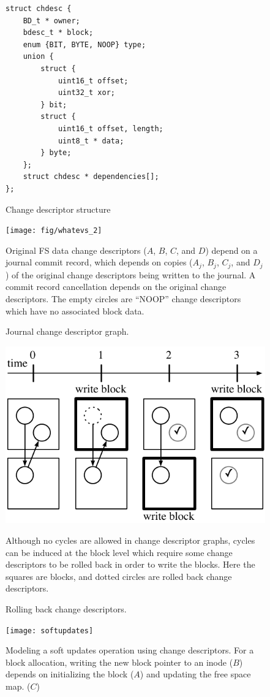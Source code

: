 \begin{figure}
\begin{verbatim}
struct chdesc {
    BD_t * owner;
    bdesc_t * block;
    enum {BIT, BYTE, NOOP} type;
    union {
        struct {
            uint16_t offset;
            uint32_t xor;
        } bit;
        struct {
            uint16_t offset, length;
            uint8_t * data;
        } byte;
    };
    struct chdesc * dependencies[];
};
\end{verbatim}
\caption{\label{fig:chdesc} Change descriptor structure}
\end{figure}

\begin{figure}
  \centering
  \texttt{[image: fig/whatevs\_2]}
  \caption{\label{fig:journal} Journal change descriptor graph.}{Original FS
  data change descriptors ($A$, $B$, $C$, and $D$) depend on a journal commit
  record, which depends on copies ($A_j$, $B_j$, $C_j$, and $D_j$) of the
  original change descriptors being written to the journal. A commit record
  cancellation depends on the original change descriptors. The empty circles are
  ``NOOP'' change descriptors which have no associated block data.}
\end{figure}

\begin{figure}
  \centering
  \includegraphics[width=\columnwidth]{rollback_sequence}
  \caption{\label{fig:rollback} Rolling back change descriptors.}{Although no
  cycles are allowed in change descriptor graphs, cycles can be induced at the
  block level which require some change descriptors to be rolled back in order
  to write the blocks. Here the squares are blocks, and dotted circles are
  rolled back change descriptors.}
\end{figure}

\begin{figure}
  \centering
  \texttt{[image: softupdates]}
  \caption{\label{fig:softupdates} Modeling a soft updates operation using
  change descriptors. For a block allocation, writing the new block pointer to
  an inode ($B$) depends on initializing the block ($A$) and updating the free
  space map. ($C$)}
\end{figure}

